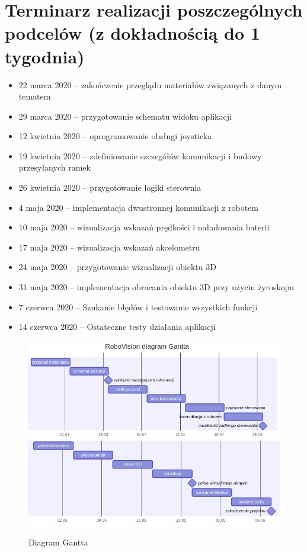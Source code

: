\documentclass[12pt,a4paper,polish]{article}
\begin{document}
  \newpage
  \section{Terminarz realizacji poszczególnych podcelów 
     {\small (z dokładnością do 1 tygodnia)}}

  \begin{itemize}
    \item 22 marca 2020  -- zakończenie przeglądu materiałów
                            związanych z danym tematem
    \item 29 marca 2020 -- przygotowanie schematu widoku aplikacji
    \item 12 kwietnia 2020 -- oprogramowanie obsługi joysticka
    \item 19 kwietnia 2020 -- zdefiniowanie szczegółów komunikacji i budowy przesyłanych ramek
    \item 26 kwietnia 2020 -- przygotowanie logiki sterownia
    \item  4 maja 2020 -- implementacja dwustronnej komunikacji z robotem
    \item 10 maja 2020 -- wizualizacja wskazań prędkości i naładowania baterii
    \item 17 maja 2020 -- wizualizacja wskazań akcelometru
    \item 24 maja 2020 -- przygotowanie wizualizacji obiektu 3D
    \item 31 maja 2020 -- implementacja obracania obiektu 3D przy użyciu żyroskopu
    \item  7 czerwca 2020 -- Szukanie błędów i testowanie wszystkich funkcji
    \item 14 czerwca 2020 -- Ostateczne testy działania aplikacji
  \end{itemize}

  \begin{figure}[ht]
    \centering
    \includegraphics[width=1\textwidth]{gantt.jpg}
    \includegraphics[width=1\textwidth]{gantt2.jpg}
    \caption{Diagram Gantta}
    \label{fig:ogniwa}
  \end{figure}
\end{document}
